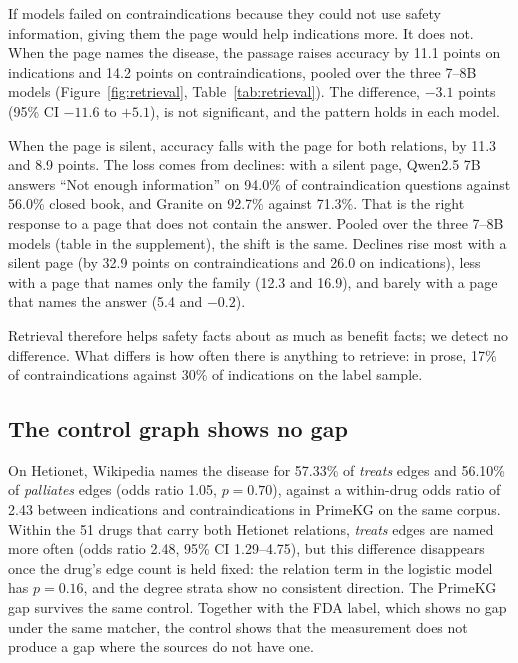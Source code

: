 \documentclass[letterpaper]{article} %
\begin{document}
If models failed on contraindications because they could not use safety
information, giving them the page would help indications more. It does not.
When the page names the disease, the passage raises accuracy by 11.1 points on
indications and 14.2 points on contraindications, pooled over the three 7--8B
models (Figure~\ref{fig:retrieval}, Table~\ref{tab:retrieval}). The difference,
$-3.1$ points (95\% CI $-11.6$ to $+5.1$), is not significant, and the pattern
holds in each model.

When the page is silent, accuracy falls with the page for both relations, by
11.3 and 8.9 points. The loss comes from declines: with a silent page, Qwen2.5
7B answers ``Not enough information'' on 94.0\% of contraindication questions
against 56.0\% closed book, and Granite on 92.7\% against 71.3\%. That is the
right response to a page that does not contain the answer.
Pooled over the three 7--8B models (table in the supplement), the shift is the same. Declines rise most with a silent page (by 32.9 points on
contraindications and 26.0 on indications), less with a page that names only
the family (12.3 and 16.9), and barely with a page that names the answer (5.4
and $-0.2$).


Retrieval therefore
helps safety facts about as much as benefit facts; we detect no difference. What differs is
how often there is anything to retrieve: in prose, 17\% of contraindications
against 30\% of indications on the label sample.

\subsection{The control graph shows no gap}

On Hetionet, Wikipedia names the disease for 57.33\% of \emph{treats} edges and
56.10\% of \emph{palliates} edges (odds ratio 1.05, $p = 0.70$), against a
within-drug odds ratio of 2.43 between indications and contraindications in
PrimeKG on the same corpus. Within the 51 drugs that carry both Hetionet
relations, \emph{treats} edges are named more often (odds ratio 2.48, 95\% CI
1.29--4.75), but this difference disappears once the drug's edge count is held
fixed: the relation term in the logistic model has $p = 0.16$, and the degree
strata show no consistent direction. The PrimeKG gap survives the same control.
Together with the FDA label, which shows no gap under the same matcher, the
control shows that the measurement does not produce a gap where the sources do
not have one.
\end{document}
